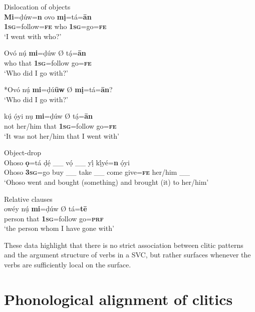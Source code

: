 \documentclass[output=paper]{langsci/langscibook}
\begin{document}
\ea\label{ex:rolle:41}
{Dislocation of objects}\\
\gll   \textbf{Mi}=ḍúw=\textbf{n}     ovo     \textbf{mị}=tá=\textbf{ān}\\
      \textbf{1}\textbf{\textsc{sg}}=follow=\textbf{\textsc{fe}}   who   \textbf{1}\textbf{\textsc{sg}}=go=\textbf{\textsc{fe}}\\
\glt ‘I went with who?’
\z

\ea\label{ex:rolle:42}
\gll   Ovó   nụ́   \textbf{mi}=ḍúw    Ø  tạ́=\textbf{ān}\\
      who   that   \textbf{1}\textbf{\textsc{sg}}=follow  { }  go=\textbf{\textsc{fe}}\\
\glt ‘Who did I go with?’
\z

\ea\label{ex:rolle:43}
    *Ovó nụ́ \textbf{mi}=ḍú\textbf{ūw} Ø \textbf{mị}=tá=\textbf{ān}?\\
\glt ‘Who did I go with?’
\z

\ea\label{ex:rolle:44}
\gll   kụ́   ọ́yi     nụ     \textbf{mi}=ḍúw   Ø  tạ́=\textbf{ān}\\
       not   her/him   that     \textbf{\textsc{1sg}}=follow  { }   go=\textbf{\textsc{fe}}\\
\glt ‘It was not her/him that I went with’ 
\z

\ea\label{ex:rolle:45}
{Object-drop}\\
\gll  Ohoso   \textbf{ọ}=tá   ḍẹ́  \_\_   vọ́   \_\_  yị́    kị́yé=\textbf{n}   ọ́yi\\
     Ohoso   \textbf{3}\textbf{\textsc{sg}}=go   buy   \_\_  take \_\_  come   give=\textbf{\textsc{fe}}  her/him  \_\_\\
\glt ‘Ohoso went and bought (something) and brought (it) to her/him’ \citep[121]{Kari2004}
\z

\ea\label{ex:rolle:46}
{Relative clauses} \\
\gll  owéy     nụ́     \textbf{mi}=ḍúw Ø tá=\textbf{tē}\\
     person    that    \textbf{\textsc{1sg}}=follow  { }  go=\textbf{\textsc{prf}}\\
\glt ‘the person whom I have gone with’
\z

These data highlight that there is no strict association between clitic patterns and the argument structure of verbs in a SVC, but rather surfaces whenever the verbs are sufficiently local on the surface. 

\section{Phonological alignment of clitics} 
\end{document}
